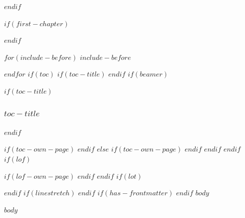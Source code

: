 \documentclass{article}
\begin{document}
$endif$
\setcounter{page}{0} %

$if(first-chapter)$
\setcounter{chapter}{$first-chapter$}
\addtocounter{chapter}{-1}
$endif$

$for(include-before)$
$include-before$

$endfor$
$if(toc)$
$if(toc-title)$
\renewcommand*\contentsname{$toc-title$}
$endif$
$if(beamer)$
\begin{frame}[allowframebreaks]
$if(toc-title)$
  \frametitle{$toc-title$}
$endif$
  \tableofcontents[hideallsubsections]
\end{frame}
$if(toc-own-page)$
\newpage
$endif$
$else$
{
\setcounter{tocdepth}{$toc-depth$}
\tableofcontents
$if(toc-own-page)$
\newpage
$endif$
}
$endif$
$endif$
$if(lof)$
\listoffigures
$if(lof-own-page)$
\newpage
$endif$
$endif$
$if(lot)$
\listoftables
$endif$
$if(linestretch)$
$endif$
$if(has-frontmatter)$
\mainmatter
$endif$
$body$


$body$
\end{document}
